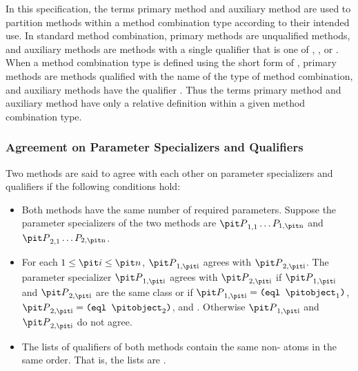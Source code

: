In this specification, the terms {\bit primary method\/} and {\bit
auxiliary method\/} are used to partition methods within a method
combination type according to their intended use.  In standard method
combination, primary methods are unqualified methods, and auxiliary
methods are methods with a single qualifier that is one of 
, , or .  When a method combination
type is defined using the short form of 
, primary methods are methods qualified with
the name of the type of method combination, and auxiliary methods have
the qualifier .  Thus the terms {\bit primary method\/}
and {\bit auxiliary method\/} have only a relative definition within a
given method combination type.

\subsubsection{Agreement on Parameter Specializers and Qualifiers}
\label{Agreement-on-Parameter-Specializers-and-Qualifiers-SECTION}

Two methods are said to agree with each other on parameter specializers
and qualifiers if the following conditions hold:

\begin{itemize}

\item Both methods have the same number of required parameters.
Suppose the parameter specializers of the two methods are
${\it P}\sub{1,1}\ldots P\sub{1,\hbox{\scriptsize\it n}}$
and ${\it P}\sub{2,1}\ldots P\sub{2,\hbox{\scriptsize\it n}}$.

\item For each $1\leq {\it i}\leq {\it n}$,
${\it P}\sub{1,\hbox{\scriptsize\it i}}$ agrees with ${\it P}\sub{2,\hbox{\scriptsize\it i}}$.
The parameter specializer ${\it P}\sub{1,\hbox{\scriptsize\it i}}$
agrees with ${\it P}\sub{2,\hbox{\scriptsize\it i}}$ if
${\it P}\sub{1,\hbox{\scriptsize\it i}}$ and ${\it P}\sub{2,\hbox{\scriptsize\it i}}$ are the same class or if 
${\it P}\sub{1,\hbox{\scriptsize\it i}}=\hbox{{\tt(\cd{eql} $\hbox{{\it object}}\sub 1$)}}$,
${\it P}\sub{2,\hbox{\scriptsize\it i}}=\hbox{{\tt(\cd{eql} $\hbox{{\it object}}\sub 2$)}}$, and
.
Otherwise ${\it P}\sub{1,\hbox{\scriptsize\it i}}$ and ${\it P}\sub{2,\hbox{\scriptsize\it i}}$ do not agree.


\item The lists of qualifiers of both methods contain the same 
non- atoms in the same order. That is, the lists are .

\end{itemize}


